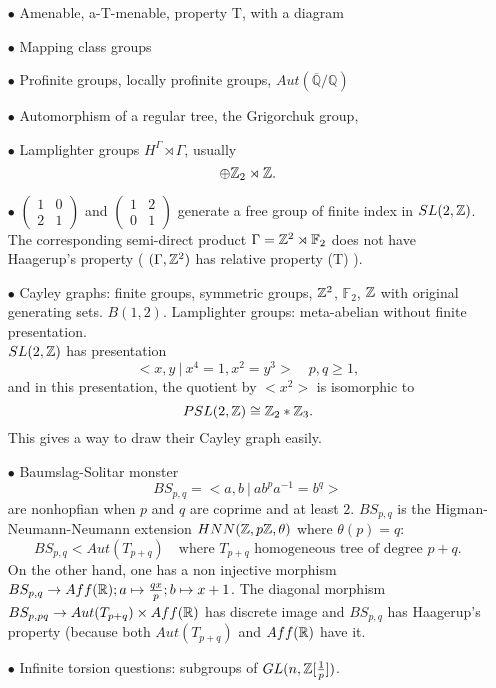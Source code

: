 \begin{itemize}
\item[$\bullet$] Amenable, a-T-menable, property T, with a diagram
\item[$\bullet$] Mapping class groups 
\item[$\bullet$] Profinite groups, locally profinite groups, $Aut(\overline{\mathbb Q} /\mathbb Q)$
\item[$\bullet$] Automorphism of a regular tree, the Grigorchuk group,
\item[$\bullet$] Lamplighter groups $ H^\Gamma\rtimes \Gamma$, usually 
\[\oplus \mathbb Z_2 \rtimes \mathbb Z.\]
\item[$\bullet$] $\begin{pmatrix}1 & 0 \\ 2 & 1\end{pmatrix}$ and $\begin{pmatrix}1 & 2 \\ 0 & 1\end{pmatrix}$ generate a free group of finite index in $SL(2,\mathbb Z)$. The corresponding semi-direct product $\Gamma = \mathbb Z^2\rtimes \mathbb F_2$ does not have Haagerup's property ( $(\Gamma, \mathbb Z^2)$ has relative property (T) ).\\

\item[$\bullet$] Cayley graphs: finite groups, symmetric groups, $\mathbb Z^2$, $\mathbb F_2$, $\mathbb Z$ with original generating sets. $B(1,2)$. Lamplighter groups: meta-abelian without finite presentation. \\

$SL(2,\mathbb Z)$ has presentation 
\[<x,y \ | \ x^4=1, x^2=y^3> \quad p,q \geq 1,\] 
and in this presentation, the quotient by $<x^2>$ is isomorphic to \[PSL(2,\mathbb Z)\cong \mathbb Z_2 \ast \mathbb Z_3.\] This gives a way to draw their Cayley graph easily.\\

\item[$\bullet$] Baumslag-Solitar monster
\[BS_{p,q} = <a,b \ | \ ab^p a^{-1} = b^q>\]
are nonhopfian when $p$ and $q$ are coprime and at least $2$. $BS_{p,q}$ is the Higman-Neumann-Neumann extension $HNN(\mathbb Z,p \mathbb Z, \theta)$ where $\theta(p)=q$: 
\[BS_{p,q} < Aut(T_{p+q}) \quad \text{where } T_{p+q}\text{ homogeneous tree of degree }p+q.\]
On the other hand, one has a non injective morphism $BS_{p,q}\rightarrow Aff(\mathbb R); a \mapsto \frac{qx}{p} ; b\mapsto x+1$. The diagonal morphism $BS_{p,pq} \rightarrow Aut(T_{p+q})\times Aff(\mathbb R)$ has discrete image and $BS_{p,q}$ has Haagerup's property (because both $Aut(T_{p+q})$ and $Aff(\mathbb R)$ have it.\\

\item[$\bullet$] Infinite torsion questions: subgroups of $GL(n, \mathbb Z[\frac{1}{p}])$.\\
\end{itemize}

